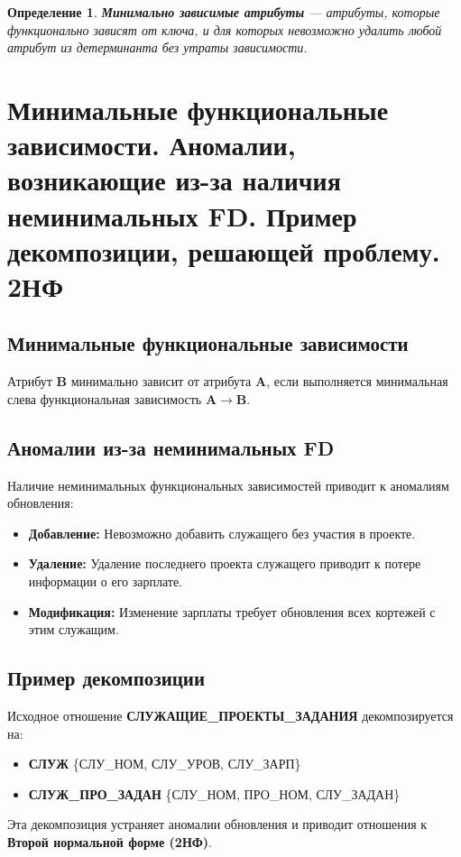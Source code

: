 \documentclass[a4paper,12pt]{article}
\newtheorem{definition}{Определение}
\begin{document}
\begin{definition}
    \textbf{Минимально зависимые атрибуты} — атрибуты, которые функционально зависят от ключа, и для которых невозможно удалить любой атрибут из детерминанта без утраты зависимости.
\end{definition}

\section{Минимальные функциональные зависимости. Аномалии, возникающие из-за наличия неминимальных FD. Пример декомпозиции, решающей проблему. 2НФ}

\subsection{Минимальные функциональные зависимости}

Атрибут \textbf{B} минимально зависит от атрибута \textbf{A}, если выполняется минимальная слева функциональная зависимость \(\mathbf{A \rightarrow B}\).

\subsection{Аномалии из-за неминимальных FD}

Наличие неминимальных функциональных зависимостей приводит к аномалиям обновления:
\begin{itemize}
    \item \textbf{Добавление:} Невозможно добавить служащего без участия в проекте.
    \item \textbf{Удаление:} Удаление последнего проекта служащего приводит к потере информации о его зарплате.
    \item \textbf{Модификация:} Изменение зарплаты требует обновления всех кортежей с этим служащим.
\end{itemize}

\subsection{Пример декомпозиции}

Исходное отношение \textbf{СЛУЖАЩИЕ\_ПРОЕКТЫ\_ЗАДАНИЯ} декомпозируется на:
\begin{itemize}
    \item \textbf{СЛУЖ} \{СЛУ\_НОМ, СЛУ\_УРОВ, СЛУ\_ЗАРП\}
    \item \textbf{СЛУЖ\_ПРО\_ЗАДАН} \{СЛУ\_НОМ, ПРО\_НОМ, СЛУ\_ЗАДАН\}
\end{itemize}
Эта декомпозиция устраняет аномалии обновления и приводит отношения к \textbf{Второй нормальной форме (2НФ)}.
\end{document}
